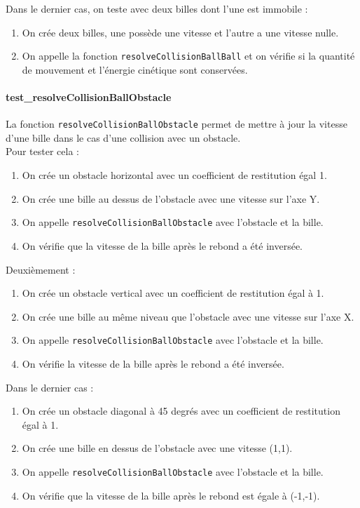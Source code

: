 \documentclass{report}
\begin{document}
Dans le dernier cas, on teste avec deux billes dont l’une est immobile :

\begin{enumerate}
\item On crée deux billes, une possède une vitesse et l’autre a une vitesse nulle.
\item On appelle la fonction \texttt{resolveCollisionBallBall} et on vérifie si la quantité de mouvement et l’énergie cinétique sont conservées.
\end{enumerate}

\paragraph{test\_resolveCollisionBallObstacle}

La fonction \texttt{resolveCollisionBallObstacle} permet de mettre à jour la vitesse d’une bille dans le cas d’une collision avec un obstacle. \\

Pour tester cela : 

\begin{enumerate}
\item On crée un obstacle horizontal avec un coefficient de restitution égal 1.
\item On crée une bille au dessus de l’obstacle avec une vitesse sur l’axe Y.
\item On appelle \texttt{resolveCollisionBallObstacle} avec l’obstacle et la bille.
\item On vérifie que la vitesse de la bille après le rebond a été inversée.\\
\end{enumerate}

Deuxièmement :

\begin{enumerate}
\item On crée un obstacle vertical avec un coefficient de restitution égal à 1.
\item On crée une bille au même niveau que l’obstacle avec une vitesse sur l’axe X.
\item On appelle \texttt{resolveCollisionBallObstacle} avec l’obstacle et la bille.
\item On vérifie la vitesse de la bille après le rebond a été inversée.\\
\end{enumerate}

Dans le dernier cas :

\begin{enumerate}
\item On crée un obstacle diagonal à 45 degrés avec un coefficient de restitution égal à 1.
\item On crée une bille en dessus de l’obstacle avec une vitesse (1,1).
\item On appelle \texttt{resolveCollisionBallObstacle} avec l’obstacle et la bille.
\item On vérifie que la vitesse de la bille après le rebond est égale à (-1,-1).
\end{enumerate}
\end{document}
